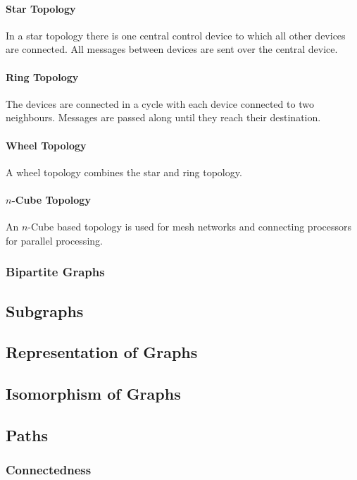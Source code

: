 \documentclass[a4paper, 10pt]{article}
\begin{document}
\paragraph{Star Topology}
In a star topology there is one central control device to which all other devices are connected. All messages between devices are sent over the central device.

\paragraph{Ring Topology}
The devices are connected in a cycle with each device connected to two neighbours. Messages are passed along until they reach their destination.

\paragraph{Wheel Topology}
A wheel topology combines the star and ring topology.

\paragraph{\(n\)-Cube Topology}
An \(n\)-Cube based topology is used for mesh networks and connecting processors for parallel processing.

\subsubsection{Bipartite Graphs}

\subsection{Subgraphs}

\subsection{Representation of Graphs}

\subsection{Isomorphism of Graphs}

\subsection{Paths}

\subsubsection{Connectedness}
\end{document}
